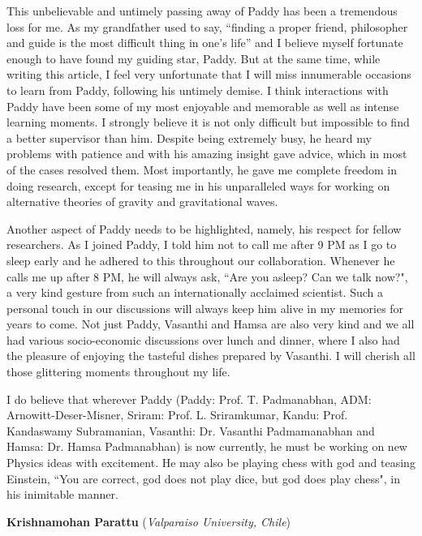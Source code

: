 \documentclass[prd, preprint, longbibliography, 11pt]{revtex4-1}
\begin{document}
This unbelievable and untimely passing away of Paddy has been a tremendous loss for me. As my grandfather used to say, ``finding a proper friend, philosopher and guide is the most difficult thing in one's life'' and I believe myself fortunate enough to have found my guiding star, Paddy. But at the same time, while writing this article, I feel very unfortunate that I will miss innumerable occasions to learn from Paddy, following his untimely demise. I think interactions with Paddy have been some of my most enjoyable and memorable as well as intense learning moments. I strongly believe it is not only difficult but impossible to find a better supervisor than him. Despite being extremely busy, he heard my problems with patience and with his amazing insight gave advice, which in most of the cases resolved them. Most importantly, he gave me complete freedom in doing research, except for teasing me in his unparalleled ways for working on alternative theories of gravity and gravitational waves. 

Another aspect of Paddy needs to be highlighted, namely, his respect for fellow researchers. As I joined Paddy, I told him not to call me after 9 PM as I go to sleep early and he adhered to this throughout our collaboration. Whenever he calls me up after 8 PM, he will always ask, ``Are you asleep? Can we talk now?", a very kind gesture from such an internationally acclaimed scientist. Such a personal touch in our discussions will always keep him alive in my memories for years to come. Not just Paddy, Vasanthi and Hamsa are also very kind and we all had various socio-economic discussions over lunch and dinner, where I also had the pleasure of enjoying the tasteful dishes prepared by Vasanthi. I will cherish all those glittering moments throughout my life. 

I do believe that wherever Paddy (Paddy: Prof. T. Padmanabhan, ADM: Arnowitt-Deser-Misner, Sriram: Prof. L. Sriramkumar, Kandu: Prof. Kandaswamy Subramanian, Vasanthi: Dr. Vasanthi Padmamanabhan and Hamsa: Dr. Hamsa Padmanabhan) is now currently, he must be working on new Physics ideas with excitement. He may also be playing chess with god and teasing Einstein, ``You are correct, god does not play dice, but god does play chess", in his inimitable manner.   

\bigskip

\bigskip



\centerline{{\bf Krishnamohan Parattu}  ({\it Valparaiso University, Chile}) }
\end{document}
